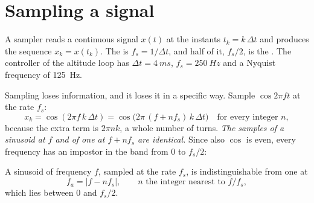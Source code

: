 \label{app:sampling}


\section{Sampling a signal}

A sampler reads a continuous signal $x(t)$ at the instants $t_k = k\,\Delta t$ and produces the sequence $x_k = x(t_k)$. The  is $f_s = 1/\Delta t$, and half of it, $f_s/2$, is the . The controller of the altitude loop has $\Delta t = \SI{4}{ms}$, $f_s = \SI{250}{Hz}$ and a Nyquist frequency of \SI{125}{Hz}.

Sampling loses information, and it loses it in a specific way. Sample $\cos 2\pi f t$ at the rate $f_s$:
\begin{equation}
  x_k = \cos(2\pi f\,k\,\Delta t) = \cos\!\big(2\pi\,(f + n f_s)\,k\,\Delta t\big) \quad\text{for every integer } n ,
\end{equation}
because the extra term is $2\pi n k$, a whole number of turns. \emph{The samples of a sinusoid at $f$ and of one at $f + nf_s$ are identical.} Since also $\cos$ is even, every frequency has an impostor in the band from 0 to $f_s/2$:

\begin{result}
A sinusoid of frequency $f$, sampled at the rate $f_s$, is indistinguishable from one at
\begin{equation}\label{eq:D-alias}
  f_a = |f - n f_s|, \qquad n \text{ the integer nearest to } f/f_s ,
\end{equation}
which lies between 0 and $f_s/2$.
\end{result}


